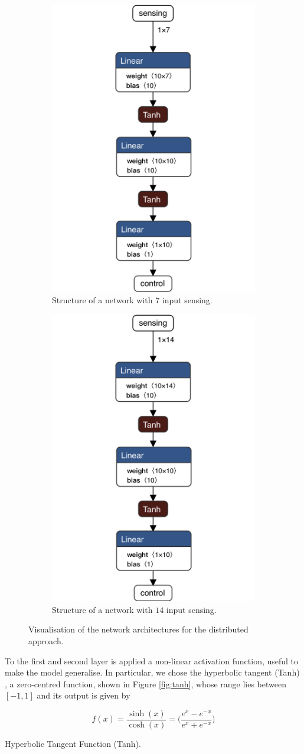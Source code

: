 \begin{figure}[htb]
	\centering
	\begin{subfigure}[h]{0.495\textwidth}
		\centering
		\includegraphics[width=.3\textwidth]{contents/images/task1distributed@4x}%
		\caption{Structure of a network with $7$ input sensing.}
		\label{fig:singlenet7distributed1}
	\end{subfigure}
	\hfill
	\begin{subfigure}[h]{0.495\textwidth}
		\centering
		\includegraphics[width=.3\textwidth]{contents/images/task1distributed_all@4x}
		\caption{Structure of a network with $14$ input sensing.}
		\label{fig:singlenet14distributed1}
	\end{subfigure}
	\caption[Network architectures for the distributed approach.]{Visualisation of 
	the network architectures for the distributed approach.}
	\label{fig:singlenetdistributed1}
\end{figure}

To the first and second layer is applied a non-linear activation function, 
useful to make the model generalise. 
In particular, we chose the hyperbolic tangent (Tanh) 
\cite[see][]{kalman1992tanh}, a zero-centred function, shown in Figure 
\ref{fig:tanh}, whose range lies between $[-1, 1]$ and its output is given by

\begin{Equation}[H]
	\centering
	\begin{equation}
	f(x)= \frac{\sinh (x)}{\cosh (x)} = \bigg( \frac{e^x - e^{-x}}{e^x + 
		e^{-x}}\bigg)
	\end{equation}
	\caption{Hyperbolic Tangent Function (Tanh).}
	\label{eq:tanh}
\end{Equation}

